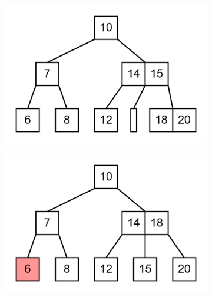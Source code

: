 \documentclass[11pt,a4paper]{article}
\begin{document}
\begin{loesung}
\begin{enumerate}
\begin{figure}[h!]
\begin{subfigure}[b]{0.31\textwidth}
            \end{subfigure}
            \begin{subfigure}[b]{0.31\textwidth}
                \centering
                \includegraphics[scale=0.15]{img/3e/5}
            \end{subfigure}
            \begin{subfigure}[b]{0.31\textwidth}
                \centering
                \includegraphics[scale=0.15]{img/3e/6}
            \end{subfigure}
            \begin{subfigure}[b]{0.31\textwidth}
                \centering

\end{subfigure}
\end{figure}
\end{enumerate}
\end{loesung}
\end{document}
